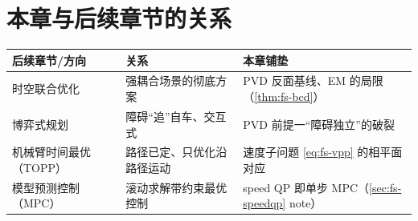 \section*{本章与后续章节的关系}
\begin{table}[H]\centering\small
\label{tab:fs-relations}
\begin{tabular}{lll}
\toprule
后续章节/方向 & 关系 & 本章铺垫 \\
\midrule
时空联合优化 & 强耦合场景的彻底方案 & PVD 反面基线、EM 的局限（\cref{thm:fs-bcd}）\\
博弈式规划 & 障碍“追”自车、交互式 & PVD 前提一“障碍独立”的破裂 \\
机械臂时间最优（TOPP） & 路径已定、只优化沿路径运动 & 速度子问题 \cref{eq:fs-vpp} 的相平面对应 \\
模型预测控制（MPC） & 滚动求解带约束最优控制 & speed QP 即单步 MPC（\cref{sec:fs-speedqp} note）\\
\bottomrule
\end{tabular}
\end{table}

